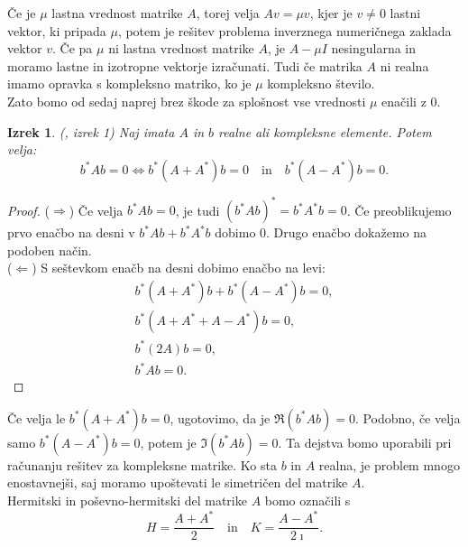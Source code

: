 \documentclass[12pt,a4paper]{amsart}
\theoremstyle{definition}
\theoremstyle{plain}
\newtheorem{izrek}[definicija]{Izrek}
\begin{document}
Če je $\mu$ lastna vrednost matrike $A$, torej velja $Av=\mu v$, kjer je $v\ne 0$ lastni vektor, ki pripada $\mu$, potem je rešitev problema inverznega numeričnega zaklada vektor $v$. 
Če pa $\mu$ ni lastna vrednost matrike $A$, je $A-\mu I$ nesingularna in moramo lastne in izotropne vektorje izračunati. Tudi če matrika $A$ ni realna imamo opravka s kompleksno matriko, ko je $\mu$ kompleksno število.\\
Zato bomo od sedaj naprej brez škode za splošnost vse vrednosti $\mu$ enačili z $0$.
\begin{izrek} (\cite{meurant}, izrek 1)
Naj imata $A$ in $b$ realne ali kompleksne elemente. Potem velja:
$$b^\ast Ab=0\Leftrightarrow b^\ast (A+A^\ast)b=0\quad \textrm{in} \quad b^\ast(A-A^\ast)b=0.$$
\end{izrek}
\begin{proof}
($\Rightarrow$) Če velja $b^\ast Ab=0$, je tudi $(b^\ast Ab)^\ast=b^\ast A^\ast b=0$. Če preoblikujemo prvo enačbo na desni v $b^\ast Ab +b^\ast A^\ast b$ dobimo 0. Drugo enačbo dokažemo na podoben način.\\
($\Leftarrow$) S seštevkom enačb na desni dobimo enačbo na levi:
\begin{align*}
 b^\ast (A+A^\ast)b+b^\ast(A-A^\ast)b=0,\\
b^\ast (A+A^\ast+A-A^\ast)b=0,\\
b^\ast (2A)b=0,\\
b^\ast Ab=0.
\end{align*}
\end{proof}

Če velja le $b^\ast (A+A^\ast)b=0$, ugotovimo, da je $\Re(b^\ast Ab)=0$. Podobno, če velja samo $b^\ast(A-A^\ast)b=0$, potem je $\Im(b^\ast Ab)=0$. Ta dejstva bomo uporabili pri računanju rešitev za kompleksne matrike. 
Ko sta $b$ in $A$ realna, je problem mnogo enostavnejši, saj moramo upoštevati le simetričen del matrike $A$.\\
Hermitski in poševno-hermitski del matrike $A$ bomo označili s $$H=\frac{A+A^\ast}{2}\quad \text{in} \quad K=\frac{A-A^\ast}{2\imath}.$$
\end{document}
